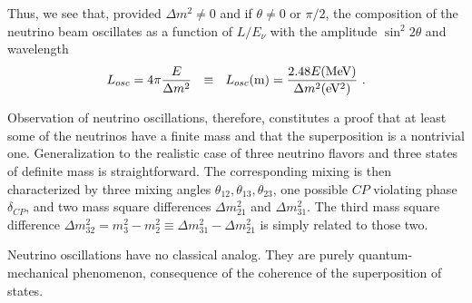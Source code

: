 {{Thus, we see that, provided $\Delta m^2 \ne 0$ and if $\theta \ne 0$ or $\pi/2$, the composition of the neutrino beam oscillates as a function of $L/E_{\nu}$ 
with the amplitude $\sin^2 2 \theta$ and wavelength
\begin{equation}
L_{osc} = 4 \pi \frac{E}{\Delta m^2} ~~\equiv ~~ L_{osc} ({\rm m}) = \frac{2.48 E {\rm (MeV)}}{ \Delta m^2 {\rm (eV^2)}} ~. 
\end{equation}

Observation of neutrino oscillations, therefore, constitutes a proof that at least some of the neutrinos have a finite mass and that the superposition is
a nontrivial one. Generalization to the realistic case of three neutrino flavors and three
states of definite mass is straightforward. The corresponding mixing is then characterized by three mixing angles $\theta_{12}, \theta_{13}, \theta_{23}$,
 one possible $CP$ violating phase $\delta_{CP}$,
and two mass square differences $\Delta m^2_{21}$ and  $\Delta m^2_{31}$. The third mass square difference 
$\Delta m^2_{32} = m^2_3 - m^2_2 \equiv \Delta m^2_{31} - \Delta m^2_{21}$ is simply related
to those two. 

Neutrino oscillations have no classical analog. They are purely quantum-mechanical phenomenon, consequence of the coherence of the
superposition of states.

    }%
}

\vspace{10pt}

\twocolumngrid

